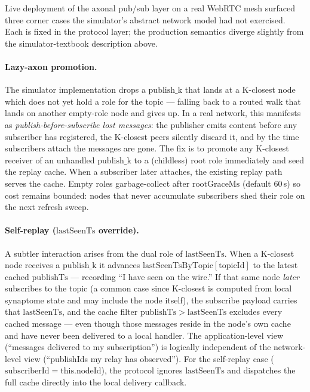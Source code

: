 \documentclass[conference]{IEEEtran}
\begin{document}
Live deployment of the axonal pub/sub layer on a
real WebRTC mesh surfaced three corner cases the simulator's abstract
network model had not exercised. Each is fixed in the protocol layer;
the production semantics diverge slightly from the simulator-textbook
description above.

\paragraph{Lazy-axon promotion.}
The simulator implementation drops a $\mathrm{publish\_k}$ that lands
at a K-closest node which does not yet hold a role for the topic ---
falling back to a routed walk that lands on another empty-role node
and gives up. In a real network, this manifests as
\emph{publish-before-subscribe lost messages}: the publisher emits
content before any subscriber has registered, the K-closest peers
silently discard it, and by the time subscribers attach the messages
are gone. The fix is to promote any K-closest receiver of an unhandled
$\mathrm{publish\_k}$ to a (childless) root role immediately and seed
the replay cache. When a subscriber later attaches, the existing
replay path serves the cache. Empty roles garbage-collect after
$\mathrm{rootGraceMs}$ (default $60$\,s) so cost remains bounded:
nodes that never accumulate subscribers shed their role on the next
refresh sweep.

\paragraph{Self-replay (\boldmath$\mathrm{lastSeenTs}$ override).}
A subtler interaction arises from the dual role of
$\mathrm{lastSeenTs}$. When a K-closest node receives a
$\mathrm{publish\_k}$ it advances
$\mathrm{lastSeenTsByTopic}[\mathrm{topicId}]$ to the latest cached
$\mathrm{publishTs}$ --- recording ``I have seen on the wire.'' If
that same node \emph{later} subscribes to the topic (a common case
since K-closest is computed from local synaptome state and may
include the node itself), the subscribe payload carries that
$\mathrm{lastSeenTs}$, and the cache filter
$\mathrm{publishTs} > \mathrm{lastSeenTs}$ excludes every cached
message --- even though those messages reside in the node's own
cache and have never been delivered to a local handler. The
application-level view (``messages delivered to my subscription'')
is logically independent of the network-level view (``publishIds my
relay has observed''). For the self-replay case
($\mathrm{subscriberId} = \mathrm{this.nodeId}$), the protocol
ignores $\mathrm{lastSeenTs}$ and dispatches the full cache directly
into the local delivery callback.
\end{document}
